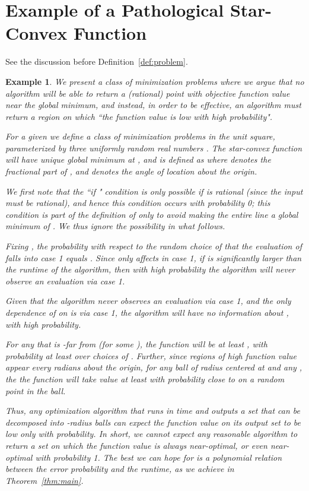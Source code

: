 \documentclass[11pt,letter]{article}
\newcounter{nTheorems}
\numberwithin{nTheorems}{section}
\newtheorem{example}[nTheorems]{Example}
\begin{document}
\section{Example of a Pathological Star-Convex Function}\label{ap:examples}

See the discussion before Definition~\ref{def:problem}.

\begin{example}\label{ex:output}
We present a class of minimization problems where we argue that no algorithm will be able to return a (rational) point with objective function value near the global minimum, and instead, in order to be effective, an algorithm must return a region on which ``the function value is low with high probability".

  For a given  we define a class of minimization problems in the unit square, parameterized by three uniformly random real numbers . The star-convex function  will have unique global minimum at , and is defined as  where   denotes the fractional part of , and  denotes the angle of location  about the origin.

We first note that the ``if " condition is only possible if  is rational (since the input  must be rational), and hence this condition occurs with probability 0; this condition is part of the definition of  only to avoid making the entire line  a global minimum of . We thus ignore the  possibility in what follows.

Fixing , the probability with respect to the random choice of  that the evaluation of  falls into case 1 equals . Since  only affects  in case 1, if  is significantly larger than the runtime of the algorithm, then with high probability the algorithm will never observe an evaluation via case 1.

Given that the algorithm never observes an evaluation via case 1, and the only dependence of  on  is via case 1, the algorithm will have no information about , with high probability.

For any  that is -far from  (for some ), the function  will be at least , with probability at least  over choices of . Further, since regions of high function value appear every  radians about the origin, for any ball of radius  centered at  and \emph{any} , the the function  will take value at least  with probability close to  on a random point in the ball.

Thus, any optimization algorithm that runs in time  and outputs a set that can be decomposed into -radius balls can expect the function value on its output set to be low only with  probability. In short, we cannot expect any reasonable algorithm to return a set on which the function value is always near-optimal, or even near-optimal with probability 1. The best we can hope for is a polynomial relation between the error probability and the runtime, as we achieve in Theorem~\ref{thm:main}.


\end{example}
\end{document}
